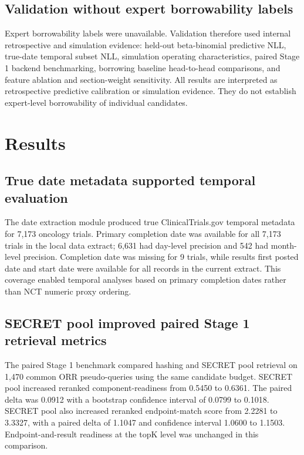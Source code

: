 \documentclass[11pt]{article}
\begin{document}
\subsection{Validation without expert borrowability labels}

Expert borrowability labels were unavailable. Validation therefore used internal retrospective and simulation evidence: held-out beta-binomial predictive NLL, true-date temporal subset NLL, simulation operating characteristics, paired Stage 1 backend benchmarking, borrowing baseline head-to-head comparisons, and feature ablation and section-weight sensitivity. All results are interpreted as retrospective predictive calibration or simulation evidence. They do not establish expert-level borrowability of individual candidates.

\section{Results}

\subsection{True date metadata supported temporal evaluation}

The date extraction module produced true ClinicalTrials.gov temporal metadata for 7,173 oncology trials. Primary completion date was available for all 7,173 trials in the local data extract; 6,631 had day-level precision and 542 had month-level precision. Completion date was missing for 9 trials, while results first posted date and start date were available for all records in the current extract. This coverage enabled temporal analyses based on primary completion dates rather than NCT numeric proxy ordering.

\subsection{SECRET pool improved paired Stage 1 retrieval metrics}

The paired Stage 1 benchmark compared hashing and SECRET pool retrieval on 1,470 common ORR pseudo-queries using the same candidate budget. SECRET pool increased reranked component-readiness from 0.5450 to 0.6361. The paired delta was 0.0912 with a bootstrap confidence interval of 0.0799 to 0.1018. SECRET pool also increased reranked endpoint-match score from 2.2281 to 3.3327, with a paired delta of 1.1047 and confidence interval 1.0600 to 1.1503. Endpoint-and-result readiness at the topK level was unchanged in this comparison.
\end{document}
